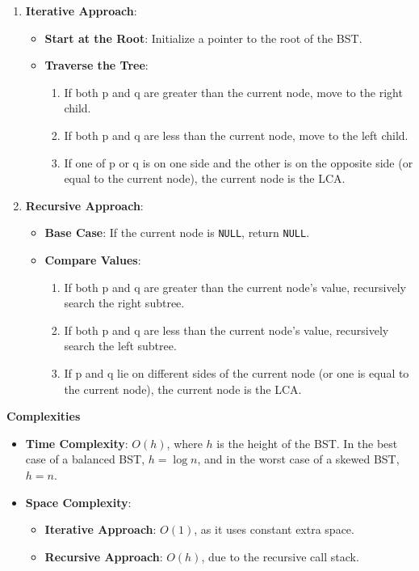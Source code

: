 \begin{enumerate}
    \item \textbf{Iterative Approach}:
    \begin{itemize}
        \item \textbf{Start at the Root}: Initialize a pointer to the root of the BST.
        \item \textbf{Traverse the Tree}:
        \begin{enumerate}
            \item If both p and q are greater than the current node, move to the right child.
            \item If both p and q are less than the current node, move to the left child.
            \item If one of p or q is on one side and the other is on the opposite side (or equal to the current node), the current node is the LCA.
        \end{enumerate}
    \end{itemize}
    
    \item \textbf{Recursive Approach}:
    \begin{itemize}
        \item \textbf{Base Case}: If the current node is \texttt{NULL}, return \texttt{NULL}.
        \item \textbf{Compare Values}:
        \begin{enumerate}
            \item If both p and q are greater than the current node's value, recursively search the right subtree.
            \item If both p and q are less than the current node's value, recursively search the left subtree.
            \item If p and q lie on different sides of the current node (or one is equal to the current node), the current node is the LCA.
        \end{enumerate}
    \end{itemize}
\end{enumerate}

\textbf{Complexities}

\begin{itemize}
    \item \textbf{Time Complexity}: \(O(h)\), where \(h\) is the height of the BST. In the best case of a balanced BST, \(h = \log n\), and in the worst case of a skewed BST, \(h = n\).
    \item \textbf{Space Complexity}:
    \begin{itemize}
        \item \textbf{Iterative Approach}: \(O(1)\), as it uses constant extra space.
        \item \textbf{Recursive Approach}: \(O(h)\), due to the recursive call stack.
    \end{itemize}
\end{itemize}

